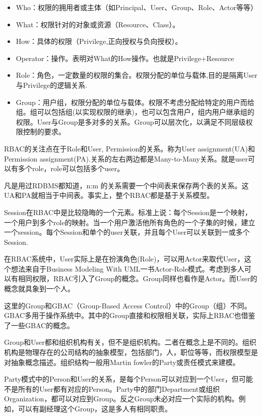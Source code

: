     \begin{itemize}
        \item Who：权限的拥用者或主体（如Principal、User、Group、Role、Actor等等）
        \item What：权限针对的对象或资源（Resource、Class）。
        \item How：具体的权限（Privilege,正向授权与负向授权）。
        \item Operator：操作。表明对What的How操作。也就是Privilege+Resource
        \item Role：角色，一定数量的权限的集合。权限分配的单位与载体,目的是隔离User与Privilege的逻辑关系.
        \item Group：用户组，权限分配的单位与载体。权限不考虑分配给特定的用户而给组。组可以包括组(以实现权限的继承)，也可以包含用户，组内用户继承组的权限。User与Group是多对多的关系。Group可以层次化，以满足不同层级权限控制的要求。
    \end{itemize}

    RBAC的关注点在于Role和User, Permission的关系。称为User assignment(UA)和Permission assignment(PA).关系的左右两边都是Many-to-Many关系。就是user可以有多个role，role可以包括多个user。

    凡是用过RDBMS都知道，n:m 的关系需要一个中间表来保存两个表的关系。这UA和PA就相当于中间表。事实上，整个RBAC都是基于关系模型。

    Session在RBAC中是比较隐晦的一个元素。标准上说：每个Session是一个映射，一个用户到多个role的映射。当一个用户激活他所有角色的一个子集的时候，建立一个session。每个Session和单个的user关联，并且每个User可以关联到一或多个Session.

    在RBAC系统中，User实际上是在扮演角色(Role)，可以用Actor来取代User，这个想法来自于Business Modeling With UML一书Actor-Role模式。考虑到多人可以有相同权限，RBAC引入了Group的概念。Group同样也看作是Actor。而User的概念就具象到一个人。

    这里的Group和GBAC（Group-Based Access Control）中的Group（组）不同。GBAC多用于操作系统中。其中的Group直接和权限相关联，实际上RBAC也借鉴了一些GBAC的概念。

    Group和User都和组织机构有关，但不是组织机构。二者在概念上是不同的。组织机构是物理存在的公司结构的抽象模型，包括部门，人，职位等等，而权限模型是对抽象概念描述。组织结构一般用Martin fowler的Party或责任模式来建模。

    Party模式中的Person和User的关系，是每个Person可以对应到一个User，但可能不是所有的User都有对应的Person。Party中的部门Department或组织Organization，都可以对应到Group。反之Group未必对应一个实际的机构。例如，可以有副经理这个Group，这是多人有相同职责。

